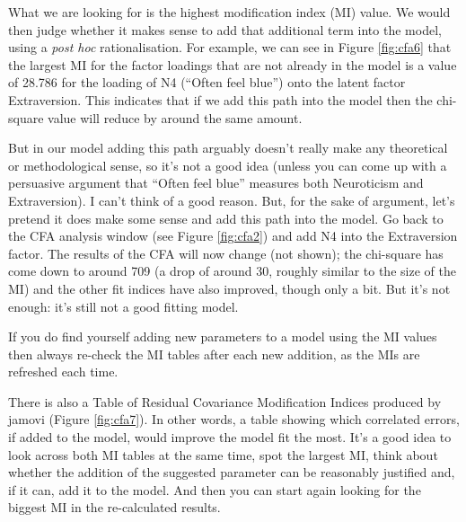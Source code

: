 \documentclass[
]{book}
\begin{document}
What we are looking for is the highest modification index (MI) value. We would then judge whether it makes sense to add that additional term into the model, using a \emph{post hoc} rationalisation. For example, we can see in Figure \ref{fig:cfa6} that the largest MI for the factor loadings that are not already in the model is a value of 28.786 for the loading of N4 (``Often feel blue'') onto the latent factor Extraversion. This indicates that if we add this path into the model then the chi-square value will reduce by around the same amount.

But in our model adding this path arguably doesn't really make any theoretical or methodological sense, so it's not a good idea (unless you can come up with a persuasive argument that ``Often feel blue'' measures both Neuroticism and Extraversion). I can't think of a good reason. But, for the sake of argument, let's pretend it does make some sense and add this path into the model. Go back to the CFA analysis window (see Figure \ref{fig:cfa2}) and add N4 into the Extraversion factor. The results of the CFA will now change (not shown); the chi-square has come down to around 709 (a drop of around 30, roughly similar to the size of the MI) and the other fit indices have also improved, though only a bit. But it's not enough: it's still not a good fitting model.

If you do find yourself adding new parameters to a model using the MI values then always re-check the MI tables after each new addition, as the MIs are refreshed each time.

There is also a Table of Residual Covariance Modification Indices produced by jamovi (Figure \ref{fig:cfa7}). In other words, a table showing which correlated errors, if added to the model, would improve the model fit the most. It's a good idea to look across both MI tables at the same time, spot the largest MI, think about whether the addition of the suggested parameter can be reasonably justified and, if it can, add it to the model. And then you can start again looking for the biggest MI in the re-calculated results.
\end{document}
